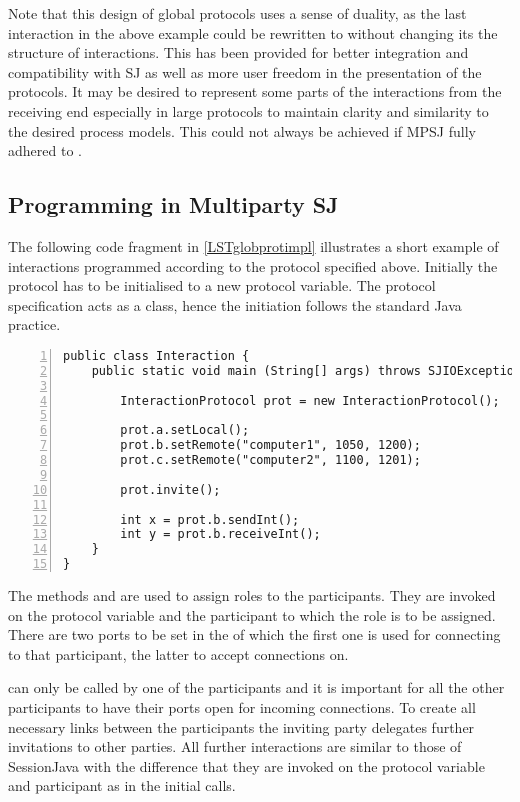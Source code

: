 Note that this design of global protocols uses a sense of duality, as the last interaction in the above example could be rewritten to  without changing its the structure of interactions. This has been provided for better integration and compatibility with SJ as well as more user freedom in the presentation of the protocols. It may be desired to represent some parts of the interactions from the receiving end especially in large protocols to maintain clarity and similarity to the desired process models. This could not always be achieved if MPSJ fully adhered to \cite{multiparty_sess_types}.

\subsection{Programming in Multiparty SJ}

The following code fragment in \autoref{LSTglobprotimpl} illustrates a short example of interactions programmed according to the protocol specified above. Initially the protocol has to be initialised to a new protocol variable. The protocol specification acts as a class, hence the initiation follows the standard Java practice.

\begin{lstlisting}[basicstyle=\LISTINGSTYLE, numbers=left, caption={Interaction implementation of the protocol from \autoref{subsec:globprotdecl}}, label={LSTglobprotimpl}]
public class Interaction {
	public static void main (String[] args) throws SJIOException {		

		InteractionProtocol prot = new InteractionProtocol();
	
		prot.a.setLocal();
		prot.b.setRemote("computer1", 1050, 1200);
		prot.c.setRemote("computer2", 1100, 1201);

		prot.invite();		

		int x = prot.b.sendInt();
		int y = prot.b.receiveInt();
	}
}
\end{lstlisting}

The methods  and  are used to assign roles to the participants. They are invoked on the protocol variable and the participant to which the role is to be assigned. There are two ports to be set in the  of which the first one is used for connecting to that participant, the latter to accept connections on. 

 can only be called by one of the participants and it is important for all the other participants to have their ports open for incoming connections. To create all necessary links between the participants the inviting party delegates further invitations to other parties. All further interactions are similar to those of SessionJava with the difference that they are invoked on the protocol variable and participant as in the initial  calls.

